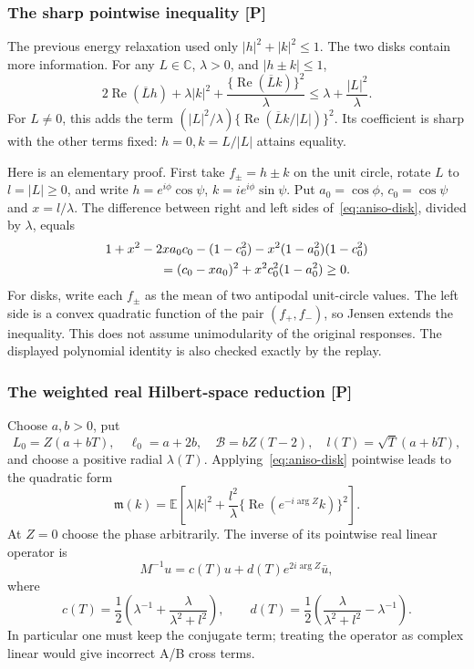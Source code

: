 \subsubsection{The sharp pointwise inequality [P]}
The previous energy relaxation used only $|h|^2+|k|^2\le1$.
The two disks contain more information. For any $L\in\mathbb C$,
$\lambda>0$, and $|h\pm k|\le1$,
\begin{equation}\label{eq:aniso-disk}
 \boxed{\quad
 2\operatorname{Re}(\overline Lh)+\lambda|k|^2
 +\frac{\{\operatorname{Re}(\overline Lk)\}^2}{\lambda}
 \le\lambda+\frac{|L|^2}{\lambda}.
 \quad}
\end{equation}
For $L\ne0$, this adds the term
$(|L|^2/\lambda)\{\operatorname{Re}(\overline Lk/|L|)\}^2$.
Its coefficient is sharp with the other terms fixed: $h=0,k=L/|L|$
attains equality.

Here is an elementary proof. First take $f_\pm=h\pm k$ on the unit circle,
rotate $L$ to $l=|L|\ge0$, and write
$h=e^{i\phi}\cos\psi$, $k=ie^{i\phi}\sin\psi$.
Put $a_0=\cos\phi$, $c_0=\cos\psi$ and $x=l/\lambda$.
The difference between right and left sides of~\eqref{eq:aniso-disk},
divided by $\lambda$, equals
\[
\begin{aligned}
 &1+x^2-2xa_0c_0-(1-c_0^2)-x^2(1-a_0^2)(1-c_0^2)\\
 &\hspace{15mm}=(c_0-xa_0)^2+x^2c_0^2(1-a_0^2)\ge0.
\end{aligned}
\]
For disks, write each $f_\pm$ as the mean of two antipodal unit-circle
values. The left side is a convex quadratic function of the pair
$(f_+,f_-)$, so Jensen extends the inequality. This does not assume
unimodularity of the original responses. The displayed polynomial identity
is also checked exactly by the replay.

\subsubsection{The weighted real Hilbert-space reduction [P]}
Choose $a,b>0$, put
\[
 L_0=Z(a+bT),\quad \ell_0=a+2b,\quad
 \mathcal B=bZ(T-2),\quad l(T)=\sqrt T(a+bT),
\]
and choose a positive radial $\lambda(T)$. Applying~\eqref{eq:aniso-disk}
pointwise leads to the quadratic form
\[
 \mathfrak m(k)=\mathbb E\left[\lambda|k|^2+
 \frac{l^2}{\lambda}\{\operatorname{Re}(e^{-i\arg Z}k)\}^2\right].
\]
At $Z=0$ choose the phase arbitrarily. The inverse of its pointwise real
linear operator is
\[
 M^{-1}u=c(T)u+d(T)e^{2i\arg Z}\bar u,
\]
where
\[
 c(T)=\frac12\left(\lambda^{-1}+\frac{\lambda}{\lambda^2+l^2}\right),
 \qquad
 d(T)=\frac12\left(\frac{\lambda}{\lambda^2+l^2}-\lambda^{-1}\right).
\]
In particular one must keep the conjugate term; treating the operator as
complex linear would give incorrect A/B cross terms.

